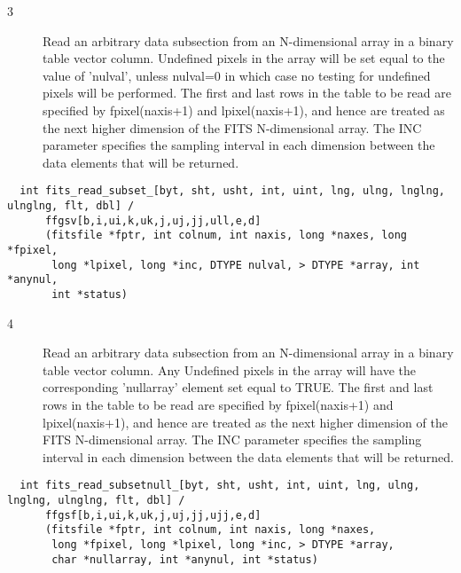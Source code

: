 \documentclass[11pt]{book}
\begin{document}
\begin{description}
\item[3 ] Read an arbitrary data subsection from an N-dimensional array
    in a binary table vector column.  Undefined pixels
    in the array will be set equal to the value of 'nulval',
    unless nulval=0 in which case no testing for undefined pixels will
    be performed.  The first and last rows in the table to be read
    are specified by fpixel(naxis+1) and lpixel(naxis+1), and hence
    are treated as the next higher dimension of the FITS N-dimensional
    array.  The INC parameter specifies the sampling interval in
   each dimension between the data elements that will be returned. \label{ffgsvx2}
\end{description}

\begin{verbatim}
  int fits_read_subset_[byt, sht, usht, int, uint, lng, ulng, lnglng, ulnglng, flt, dbl] /
      ffgsv[b,i,ui,k,uk,j,uj,jj,ull,e,d]
      (fitsfile *fptr, int colnum, int naxis, long *naxes, long *fpixel,
       long *lpixel, long *inc, DTYPE nulval, > DTYPE *array, int *anynul,
       int *status)
\end{verbatim}

\begin{description}
\item[4 ] Read an arbitrary data subsection from an N-dimensional array
    in a binary table vector column.  Any Undefined
    pixels in the array will have the corresponding 'nullarray'
    element set equal to TRUE.  The first and last rows in the table
    to be read are specified by fpixel(naxis+1) and lpixel(naxis+1),
    and hence are treated as the next higher dimension of the FITS
    N-dimensional array.  The INC parameter specifies the sampling
    interval in each dimension between the data elements that will be
   returned. \label{ffgsfx2}
\end{description}

\begin{verbatim}
  int fits_read_subsetnull_[byt, sht, usht, int, uint, lng, ulng, lnglng, ulnglng, flt, dbl] /
      ffgsf[b,i,ui,k,uk,j,uj,jj,ujj,e,d]
      (fitsfile *fptr, int colnum, int naxis, long *naxes,
       long *fpixel, long *lpixel, long *inc, > DTYPE *array,
       char *nullarray, int *anynul, int *status)
\end{verbatim}
\end{document}
